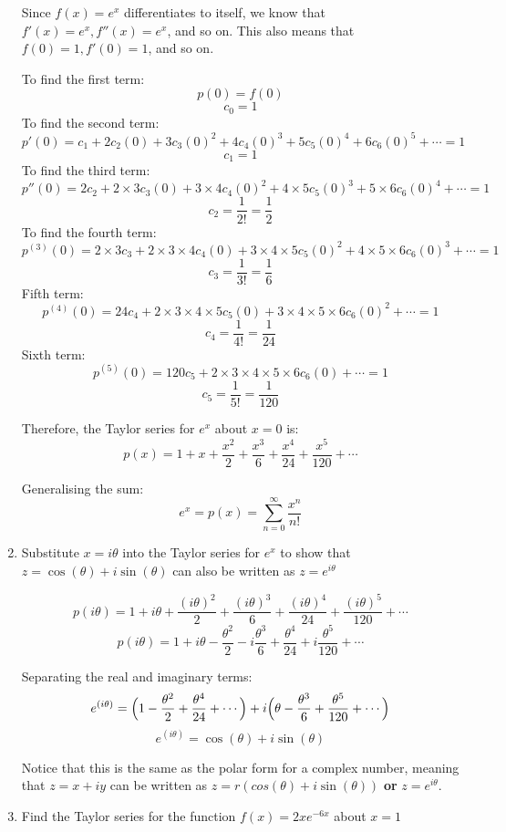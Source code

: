 \documentclass[../main.tex]{subfiles}
\begin{document}
\begin{enumerate}[itemsep=0.7cm]
    Since $f(x)=e^x$ differentiates to itself, we know that $f'(x)=e^x, f''(x)=e^x$, and so on. This also means that $f(0)=1, f'(0)=1$, and so on.

    To find the first term:
    \[p(0)=f(0)\]
    \[c_0=1\]
    To find the second term:
    \[p'(0)=c_1 + 2c_2(0) + 3c_3(0)^2 + 4c_4(0)^3 + 5c_5(0)^4 + 6c_6(0)^5 + \cdots = 1\]
    \[c_1 = 1\]
    To find the third term:
    \[p''(0)= 2c_2 + 2\times 3c_3(0) + 3\times 4c_4(0)^2 + 4\times 5c_5(0)^3 + 5\times 6c_6(0)^4 + \cdots = 1\]
    \[c_2 = \frac{1}{2!} = \frac{1}{2}\]
    To find the fourth term:
    \[p^{(3)}(0) = 2\times 3c_3 + 2\times 3\times 4c_4(0) + 3\times 4\times 5c_5(0)^2 + 4\times 5\times 6c_6(0)^3 + \cdots =1\]
    \[c_3 = \frac{1}{3!} = \frac{1}{6}\]
    Fifth term:
    \[p^{(4)}(0) = 24c_4 + 2\times 3\times 4\times 5c_5(0) + 3\times 4\times 5\times 6c_6(0)^2 + \cdots =1\]
    \[c_4 = \frac{1}{4!} = \frac{1}{24}\]
    Sixth term:
    \[p^{(5)}(0) = 120c_5 + 2\times 3\times 4\times 5\times 6c_6(0) + \cdots = 1\]
    \[c_5 = \frac{1}{5!} = \frac{1}{120}\]

    Therefore, the Taylor series for $e^x$ about $x=0$ is:
    \[p(x) = 1 + x + \frac{x^2}{2} + \frac{x^3}{6} + \frac{x^4}{24} + \frac{x^5}{120} + \cdots\]

    Generalising the sum:
    \[e^x = p(x) = \sum_{n=0}^{\infty} \frac{x^n}{n!}\]

    \item
    Substitute $x=i\theta$ into the Taylor series for $e^x$ to show that $z=\cos{(\theta)}+i \sin{(\theta)}$ can also be written as $z=e^{i \theta}$

    \[p(i\theta) = 1 + i\theta + \frac{(i\theta)^2}{2} + \frac{(i\theta)^3}{6} + \frac{(i\theta)^4}{24} + \frac{(i\theta)^5}{120} + \cdots\]
    \[p(i\theta) = 1 + i\theta - \frac{\theta^2}{2} - i\frac{\theta^3}{6} + \frac{\theta^4}{24} + i\frac{\theta^5}{120} + \cdots\]

    Separating the real and imaginary terms:
    \[e^{(i\theta)} = \Bigl(1 - \frac{\theta^2}{2} + \frac{\theta^4}{24} +\cdots \Bigr) + i\Bigl(\theta  - \frac{\theta^3}{6}  + \frac{\theta^5}{120} + \cdots \Bigr)\]
    \[e^{(i\theta)} = \cos{(\theta)} + i\sin{(\theta)}\]

    Notice that this is the same as the polar form for a complex number, meaning that $z = x + iy$ can be written as $z=r(cos{(\theta)}+i\sin{(\theta)})$ \textbf{or} $z=e^{i\theta}$.

    \item
    Find the Taylor series for the function $f(x) = 2x e^{-6x}$ about $x = 1$


\end{enumerate}
\end{document}
